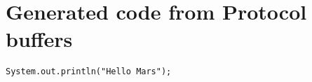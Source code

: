 \chapter{Generated code from Protocol buffers}

\begin{lstlisting}[caption={Source code of something},label=Listing]
System.out.println("Hello Mars");
\end{lstlisting}